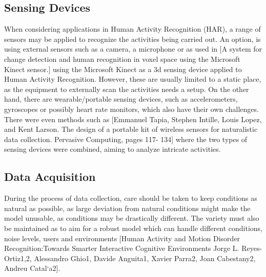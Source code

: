 
\subsection{Sensing Devices}
When considering applications in Human Activity Recognition (HAR),  a range of sensors may be applied to recognize the activities being carried out.  
An option, is using external sensors such as a camera, a microphone or as used in [A system for change detection and human
recognition in voxel space using the Microsoft Kinect sensor.] using the Microsoft Kinect as a 3d sensing device applied to Human Activity Recognition. 
However, these are usually limited to a static place, as the equipment to externally scan the activities needs a setup. On the other hand, 
there are wearable/portable sensing devices, such as accelerometers, gyroscopes or possibly heart rate monitors, which also have their own challenges. There were even methods such as 
[Emmanuel Tapia, Stephen Intille, Louis Lopez, and Kent Larson. The design of a portable kit of wireless sensors for naturalistic data collection. Pervasive Computing, pages 117-
134] where the two types of sensing devices were combined, aiming to analyze intricate activities.
\subsection{Data Acquisition}

During the process of data collection, care should be taken to keep conditions as natural as possible, as large deviation from 
natural conditions might make the model unusable, as conditions may be drastically different. The variety must also be maintained as to aim for a robust model 
which can handle different conditions, noise levels, users and environments 
[Human Activity and Motion Disorder Recognition:Towards Smarter Interactive Cognitive Environments Jorge L. Reyes-Ortiz1,2, Alessandro Ghio1, Davide Anguita1, Xavier Parra2, 
Joan Cabestany2, Andreu Catal`a2]. 


